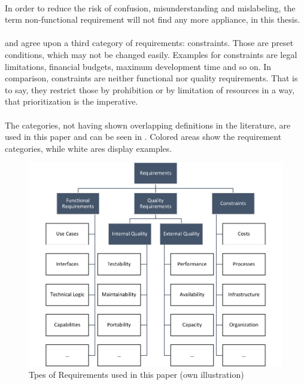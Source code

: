 \paragraph{} In order to reduce the risk of confusion, misunderstanding and mislabeling, the term non-functional requirement will not find any more appliance, in this thesis.

\paragraph{} \textcite[29]{Ebert.2014} and \textcite[18-19]{Pohl.2007} agree upon a third category of requirements: constraints. Those are preset conditions, which may not be changed easily. Examples for constraints are legal limitations, financial budgets, maximum development time and so on. In comparison, constraints are neither functional nor quality requirements. That is to say, they restrict those by prohibition or by limitation of resources in a way, that prioritization is the imperative.

\paragraph{} The categories, not having shown overlapping definitions in the literature, are used in this paper and can be seen in . Colored areas show the requirement categories, while white ares display examples.

\begin{figure}[H]
    \centering
    \includegraphics[scale=1]{img/RequirementTypes.pdf}
    \caption[Requirement Types]{Tpes of Requirements used in this paper (own illustration)}
    \label{fig:reqTypes}
\end{figure}


